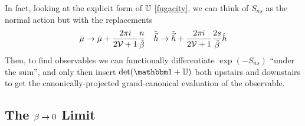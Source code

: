 In fact, looking at the explicit form of $\mathbb{U}$ \eqref{fugacity}, we can think of $S_{ns}$ as the normal action but with the replacements
\begin{align}
    \tilde{\mu}&\rightarrow \tilde{\mu} + \frac{2\pi i}{2\mathcal{V}+1} \frac{n}{\tilde{\beta}}
    &
    \tilde{\vec{h}} \rightarrow \tilde{\vec{h}} + \frac{2\pi i}{2\mathcal{V}+1} \frac{2s}{\tilde{\beta}} \hat{h}
\end{align}
Then, to find observables we can functionally differentiate $\exp(-S_{ns})$ ``under the sum'', and only then insert $\det(\one+\UU)$ both upstairs and downstairs to get the canonically-projected grand-canonical evaluation of the observable.

\subsection{The $\beta\rightarrow0$ Limit}\label{sec:canonical infinite temperature}

